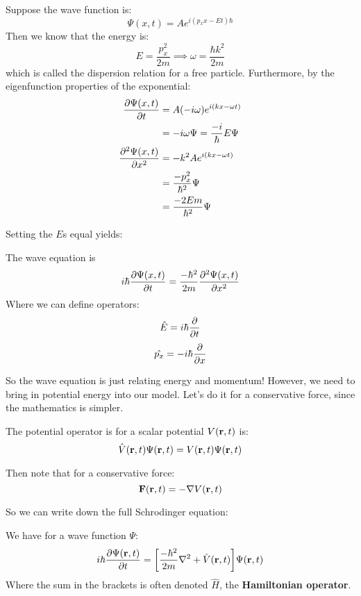 Suppose the wave function is:
\[ \Psi(x, t) = Ae^{i(p_x x - Et) \hbar} \]
Then we know that the energy is:
\[ E = \frac{p_x^2}{2m} \implies \omega = \frac{\hbar k^2}{2m} \]
which is called the dispersion relation for a free particle.
Furthermore, by the eigenfunction properties of the exponential:
\begin{align*}
    \partialderivative{\Psi(x, t)}{t} &= A(-i \omega)e^{i(kx - \omega t)} \\
    &= -i \omega \Psi = \frac{-i}{\hbar} E \Psi \\
    \partialderivative{^2 \Psi(x, t)}{x^2} &= - k^2 A e^{i(k x - \omega t)} \\
    &= \frac{-p_x^2}{\hbar^2} \Psi \\
    &= \frac{-2Em}{\hbar^2} \Psi
\end{align*}

Setting the $E$s equal yields:
\begin{theorem}
    The wave equation is
    \[ i \hbar \partialderivative{\Psi(x, t)}{t} = \frac{-\hbar^2}{2m} \partialderivative{^2\Psi(x, t)}{x^2} \]
    Where we can define operators:
    \[ \hat{E} = i \hbar \partialderivative{}{t} \]
    \[ \hat{p_x} = -i\hbar \partialderivative{}{x} \]
\end{theorem}

So the wave equation is just relating energy and momentum! However, we need to bring in potential energy into our model.
Let's do it for a conservative force, since the mathematics is simpler.

\begin{definition}
    The potential operator is for a scalar potential $V(\mathbf{r}, t)$ is:
    \[ \hat{V}(\mathbf{r}, t) \Psi(\mathbf{r}, t) = V(\mathbf{r}, t) \Psi(\mathbf{r}, t) \]
\end{definition}

Then note that for a conservative force:
\[ \mathbf{F}(\mathbf{r}, t) = - \mathbf{\nabla} V(\mathbf{r}, t) \]

So we can write down the full Schrodinger equation:
\begin{theorem} 
    We have for a wave function $\Psi$:
    \[ i \hbar \partialderivative{\Psi(\mbf{r}, t)}{t} = \qty[\frac{- \hbar^2}{2m} \nabla^2 + \hat{V}(\mbf{r}, t)] \Psi(\mbf{r}, t) \]
    Where the sum in the brackets is often denoted $\hat{H}$, the \textbf{Hamiltonian operator}.
\end{theorem}

